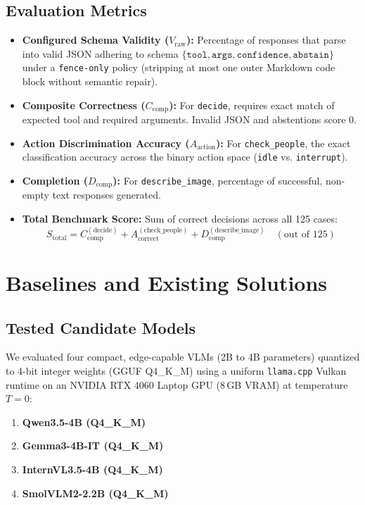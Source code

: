 ﻿\documentclass[11pt,a4paper]{article}
\begin{document}
\subsection{Evaluation Metrics}
\begin{itemize}
    \item \textbf{Configured Schema Validity ($V_{\text{raw}}$):} Percentage of responses that parse into valid JSON adhering to schema $\{\texttt{tool}, \texttt{args}, \texttt{confidence}, \texttt{abstain}\}$ under a \texttt{fence-only} policy (stripping at most one outer Markdown code block without semantic repair).
    \item \textbf{Composite Correctness ($C_{\text{comp}}$):} For \texttt{decide}, requires exact match of expected tool and required arguments. Invalid JSON and abstentions score 0.
    \item \textbf{Action Discrimination Accuracy ($A_{\text{action}}$):} For \texttt{check\_people}, the exact classification accuracy across the binary action space (\texttt{idle} vs. \texttt{interrupt}).
    \item \textbf{Completion ($D_{\text{comp}}$):} For \texttt{describe\_image}, percentage of successful, non-empty text responses generated.
    \item \textbf{Total Benchmark Score:} Sum of correct decisions across all 125 cases:
    \begin{equation}
        S_{\text{total}} = C_{\text{comp}}^{(\text{decide})} + A_{\text{correct}}^{(\text{check\_people})} + D_{\text{comp}}^{(\text{describe\_image})} \quad (\text{out of } 125)
    \end{equation}
\end{itemize}

\section{Baselines and Existing Solutions}

\subsection{Tested Candidate Models}
We evaluated four compact, edge-capable VLMs (2B to 4B parameters) quantized to 4-bit integer weights (GGUF Q4\_K\_M) using a uniform \texttt{llama.cpp} Vulkan runtime on an NVIDIA RTX 4060 Laptop GPU (8\,GB VRAM) at temperature $T=0$:
\begin{enumerate}
    \item \textbf{Qwen3.5-4B (Q4\_K\_M)}
    \item \textbf{Gemma3-4B-IT (Q4\_K\_M)}
    \item \textbf{InternVL3.5-4B (Q4\_K\_M)}
    \item \textbf{SmolVLM2-2.2B (Q4\_K\_M)}
\end{enumerate}
\end{document}
